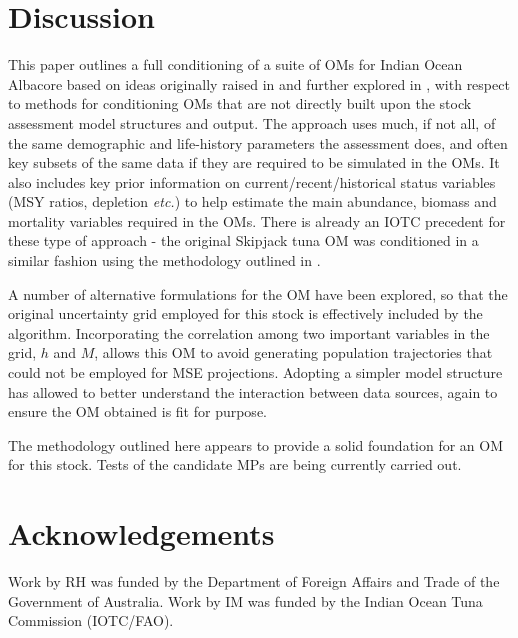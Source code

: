 \documentclass[11pt]{article}
\begin{document}
\section{Discussion}

This paper outlines a full conditioning of a suite of OMs for Indian Ocean Albacore based on ideas originally raised in \cite{om21} and further explored in \cite{om23a}, with respect to methods for conditioning OMs that are not directly built upon the stock assessment model structures and output. The approach uses much, if not all, of the same demographic and life-history parameters the assessment does, and often key subsets of the same data if they are required to be simulated in the OMs. It also includes key prior information on current/recent/historical status variables (MSY ratios, depletion \textit{etc.}) to help estimate the main abundance, biomass and mortality variables required in the OMs. There is already an IOTC precedent for these type of approach - the original Skipjack tuna OM was conditioned in a similar fashion \cite{skj} using the methodology outlined in \cite{fst}.

A number of alternative formulations for the OM have been explored, so that the original uncertainty grid employed for this stock is effectively included by the algorithm. Incorporating the correlation among two important variables in the grid, $h$ and $M$, allows this OM to avoid generating population trajectories that could not be employed for MSE projections. Adopting a simpler model structure has allowed to better understand the interaction between data sources, again to ensure the OM obtained is fit for purpose.

The methodology outlined here appears to provide a solid foundation for an OM for this stock. Tests of the candidate MPs are being currently carried out. 

\section{Acknowledgements}

Work by RH was funded by the Department of Foreign Affairs and Trade of the Government of Australia. Work by IM was funded by the Indian Ocean Tuna Commission (IOTC/FAO).
\end{document}
